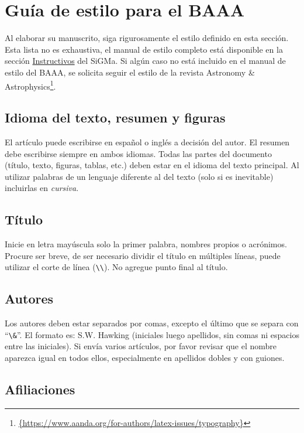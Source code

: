 \documentclass[baaa]{baaa}
\begin{document}
\section{Guía de estilo para el BAAA}\label{sec:guia}

Al elaborar su manuscrito, siga rigurosamente el estilo definido en esta sección. Esta lista no es exhaustiva, el manual de estilo completo está disponible en la sección \href{http://sigma.fcaglp.unlp.edu.ar/docs/SGM_docs_v01/Surf/index.html}{Instructivos} del SiGMa. Si algún caso no está incluido en el manual de estilo del BAAA, se solicita seguir el estilo de la revista Astronomy \& Astrophysics\footnote{\url{{https://www.aanda.org/for-authors/latex-issues/typography}}}.

\subsection{Idioma del texto, resumen y figuras}

El artículo puede escribirse en español o inglés a decisión del autor. El resumen debe escribirse siempre en ambos idiomas. Todas las partes del documento (título, texto, figuras, tablas, etc.)  deben estar en el idioma del texto principal. Al utilizar palabras de un lenguaje diferente al del texto (solo si es inevitable) incluirlas en {\em cursiva}.

\subsection{Título}

Inicie en letra mayúscula solo la primer palabra, nombres propios o acrónimos. Procure ser breve, de ser necesario dividir el título en múltiples líneas, puede utilizar el corte de línea (\verb|\\|). No agregue punto final al título.

\subsection{Autores}

Los autores deben estar separados por comas, excepto el último que se separa con ``\verb|\&|''. El formato es: S.W. Hawking (iniciales luego apellidos, sin comas ni espacios entre las iniciales). Si envía varios artículos, por favor revisar que el nombre aparezca igual en todos ellos, especialmente en apellidos dobles y con guiones.

\subsection{Afiliaciones}
\end{document}

